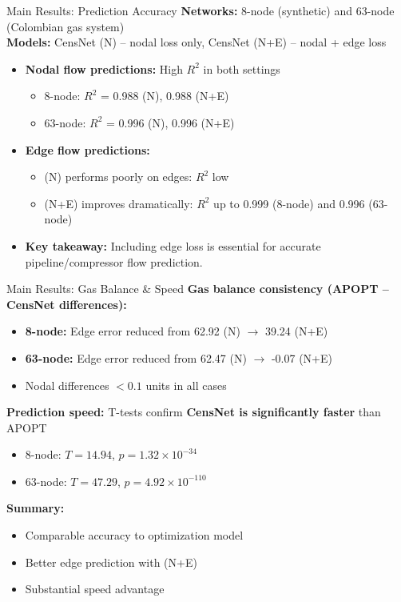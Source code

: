 \documentclass[hyperref={colorlinks,citecolor=blue,linkcolor=blue,urlcolor=blue}]{beamer}
\begin{document}
\begin{frame}{Main Results: Prediction Accuracy}
\footnotesize
\textbf{Networks:} 8-node (synthetic) and 63-node (Colombian gas system)  
\\
\textbf{Models:} CensNet (N) – nodal loss only, CensNet (N+E) – nodal + edge loss

\begin{itemize}
    \item \textbf{Nodal flow predictions:} High $R^2$ in both settings
        \begin{itemize}
            \item 8-node: $R^2$ = 0.988 (N), 0.988 (N+E)
            \item 63-node: $R^2$ = 0.996 (N), 0.996 (N+E)
        \end{itemize}
    \item \textbf{Edge flow predictions:} 
        \begin{itemize}
            \item (N) performs poorly on edges: $R^2$ low
            \item (N+E) improves dramatically: $R^2$ up to 0.999 (8-node) and 0.996 (63-node)
        \end{itemize}
    \item \textbf{Key takeaway:} Including edge loss is essential for accurate pipeline/compressor flow prediction.
\end{itemize}

\end{frame}



\begin{frame}{Main Results: Gas Balance \& Speed}
\footnotesize
\textbf{Gas balance consistency (APOPT – CensNet differences):}
\begin{itemize}
    \item \textbf{8-node:} Edge error reduced from 62.92 (N) $\rightarrow$ 39.24 (N+E)
    \item \textbf{63-node:} Edge error reduced from 62.47 (N) $\rightarrow$ -0.07 (N+E)
    \item Nodal differences $< 0.1$ units in all cases
\end{itemize}

\textbf{Prediction speed:}  
T-tests confirm \textbf{CensNet is significantly faster} than APOPT
\begin{itemize}
    \item 8-node: $T=14.94$, $p=1.32\times10^{-34}$
    \item 63-node: $T=47.29$, $p=4.92\times10^{-110}$
\end{itemize}

\textbf{Summary:}  
\begin{itemize}
    \item Comparable accuracy to optimization model
    \item Better edge prediction with (N+E)
    \item Substantial speed advantage
\end{itemize}
\end{frame}
\end{document}
